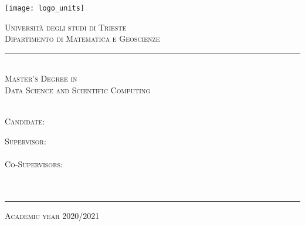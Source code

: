 \graphicspath{{frontmatter/figures/}}
\begin{titlepage}
	
	\begin{center}
	
		\texttt{[image: logo\_units]}\\[0.4cm]
			
		\vspace{0.8cm}
		
		{ \huge \scshape Università degli studi di Trieste }\\[0.25cm]
		{ \Large \scshape Dipartimento di Matematica e Geoscienze }
		\rule{\textwidth}{0.4pt}\\[0.6cm]

 		{ \Large \scshape Master's Degree in\\Data Science and Scientific Computing }\\[1.5cm]
		
		
		{ \huge \bfseries \THtitle }\\[1.5cm]
		
		\vfill
				
		\begin{minipage}[t]{0.45\textwidth}
			\begin{flushleft} %
				{ \large \scshape Candidate: }\\[0.15cm]
				{ \THauthor }
			\end{flushleft}
		\end{minipage}
		\begin{minipage}[t]{0.45\textwidth}
			\begin{flushright} %
				{ \large \scshape Supervisor: } \\[0.15cm]
				{ \THsupervisor } \\[0.50cm]
				{ \large \scshape Co-Supervisors: } \\[0.15cm]
				{ \THcosupervisor }\\
				{ \THextracosupervisor }\\
				{ \THextracosupervisortwo }
			\end{flushright}
		\end{minipage}
		
		\vspace{2cm}
		
		\rule{\textwidth}{0.4pt}
		{\large \scshape Academic year 2020/2021 }
		
	\end{center}
	
	\restoregeometry

\end{titlepage}

\clearpage
\thispagestyle{empty}